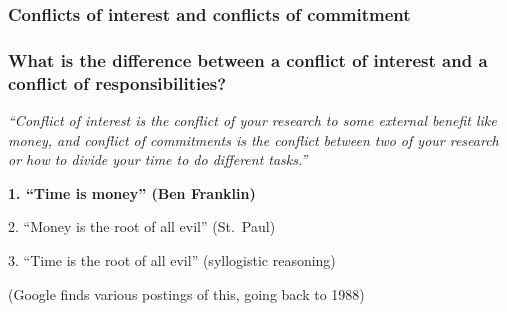 \documentclass[12pt]{beamer}
\newcommand\ans[1]{{\it ``#1''}}
\begin{document}

\begin{frame}

\frametitle{ Conflicts of interest and conflicts of commitment}

\end{frame} 

\begin{frame} %
\frametitle{ What is the difference between a conflict of interest and a conflict of responsibilities? 
}

\ans{Conflict of interest is the conflict of your research to some external benefit like money, and  conflict  of  commitments  is  the  conflict  between  two  of  your  research  or  how  to divide your time to do different tasks.}





\end{frame}

\begin{frame}

  {\bf
1. ``Time is money'' (Ben Franklin)

2. ``Money is the root of all evil'' (St.\ Paul)

3. ``Time is the root of all evil'' (syllogistic reasoning)
}

\vspace{5mm}

(Google finds various postings of this, going back to 1988)

\end{frame}
\end{document}

